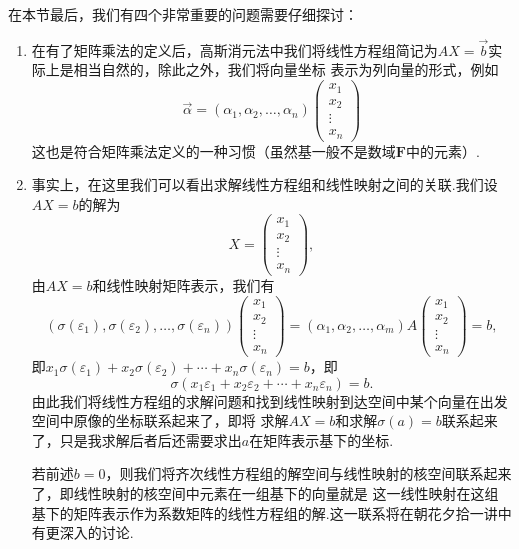 在本节最后，我们有四个非常重要的问题需要仔细探讨：
\begin{enumerate}
    \item 在有了矩阵乘法的定义后，高斯消元法中我们将线性方程组简记为$AX=\vec{b}$实际上是相当自然的，除此之外，我们将向量坐标
    表示为列向量的形式，例如
    \[\vec{\alpha}=(\alpha_1,\alpha_2,\ldots,\alpha_n)\begin{pmatrix}
        x_1 \\ x_2 \\ \vdots \\ x_n
    \end{pmatrix}\]
    这也是符合矩阵乘法定义的一种习惯（虽然基一般不是数域$\mathbf{F}$中的元素）.

    \item 事实上，在这里我们可以看出求解线性方程组和线性映射之间的关联.我们设$AX=b$的解为
    \[X=\begin{pmatrix}
        x_1 \\ x_2 \\ \vdots \\ x_n
    \end{pmatrix},\]
    由$AX=b$和线性映射矩阵表示，我们有
    \begin{equation}\label{eq:7:方程组与核空间1}
        (\sigma(\varepsilon_1),\sigma(\varepsilon_2),\ldots,\sigma(\varepsilon_n))\begin{pmatrix}
            x_1 \\ x_2 \\ \vdots \\ x_n
        \end{pmatrix}=(\alpha_1,\alpha_2,\ldots,\alpha_m)A\begin{pmatrix}
            x_1 \\ x_2 \\ \vdots \\ x_n
        \end{pmatrix}=b,
    \end{equation}
    即$x_1\sigma(\varepsilon_1)+x_2\sigma(\varepsilon_2)+\cdots+x_n\sigma(\varepsilon_n)=b$，即
    \begin{equation}\label{eq:7:方程组与核空间2}
        \sigma(x_1\varepsilon_1+x_2\varepsilon_2+\cdots+x_n\varepsilon_n)=b.
    \end{equation}
    由此我们将线性方程组的求解问题和找到线性映射到达空间中某个向量在出发空间中原像的坐标联系起来了，即将
    求解$AX=b$和求解$\sigma(a)=b$联系起来了，只是我求解后者后还需要求出$a$在矩阵表示基下的坐标.

    若前述$b=0$，则我们将齐次线性方程组的解空间与线性映射的核空间联系起来了，即线性映射的核空间中元素在一组基下的向量就是
    这一线性映射在这组基下的矩阵表示作为系数矩阵的线性方程组的解.这一联系将在朝花夕拾一讲中有更深入的讨论.


\end{enumerate}

